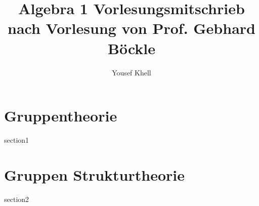 \documentclass[a4paper]{report}
\title{\vspace{-2cm} Algebra 1 Vorlesungsmitschrieb\\nach Vorlesung von Prof. Gebhard Böckle}
\author{Yousef Khell}
\begin{document}
\maketitle
\tableofcontents

\chapter{Gruppentheorie}
{section1}

\chapter{Gruppen Strukturtheorie}
{section2}
\end{document}
